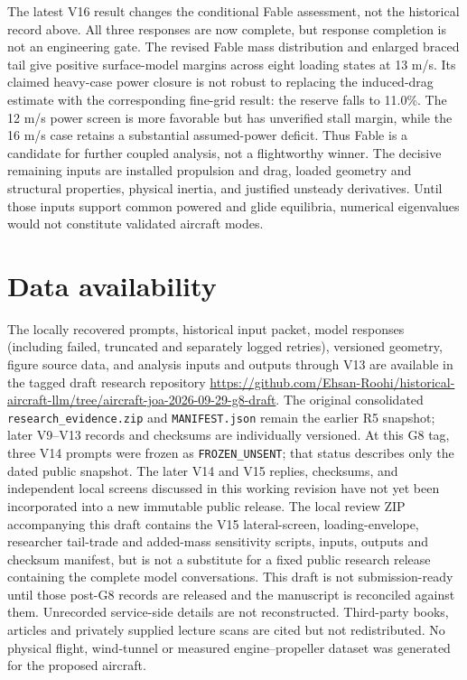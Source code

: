\documentclass[11pt,a4paper]{article}
\begin{document}
The latest V16 result changes the conditional Fable assessment, not the historical
record above. All three responses are now complete, but response completion is not
an engineering gate. The revised Fable mass distribution and enlarged braced tail
give positive surface-model margins across eight loading states at 13 m/s. Its
claimed heavy-case power closure is not robust to replacing the induced-drag
estimate with the corresponding fine-grid result: the reserve falls to 11.0\%.
The 12 m/s power screen is more favorable but has unverified stall margin, while
the 16 m/s case retains a substantial assumed-power deficit. Thus Fable is a
candidate for further coupled analysis, not a flightworthy winner. The decisive
remaining inputs are installed propulsion and drag, loaded geometry and structural
properties, physical inertia, and justified unsteady derivatives. Until those
inputs support common powered and glide equilibria, numerical eigenvalues would
not constitute validated aircraft modes.

\section*{Data availability}
The locally recovered prompts, historical input packet, model responses (including failed, truncated and separately logged retries), versioned geometry, figure source data, and analysis inputs and outputs through V13 are available in the tagged draft research repository \url{https://github.com/Ehsan-Roohi/historical-aircraft-llm/tree/aircraft-joa-2026-09-29-g8-draft}. The original consolidated \texttt{research\_evidence.zip} and \texttt{MANIFEST.json} remain the earlier R5 snapshot; later V9--V13 records and checksums are individually versioned. At this G8 tag, three V14 prompts were frozen as \texttt{FROZEN\_UNSENT}; that status describes only the dated public snapshot. The later V14 and V15 replies, checksums, and independent local screens discussed in this working revision have not yet been incorporated into a new immutable public release. The local review ZIP accompanying this draft contains the V15 lateral-screen, loading-envelope, researcher tail-trade and added-mass sensitivity scripts, inputs, outputs and checksum manifest, but is not a substitute for a fixed public research release containing the complete model conversations. This draft is not submission-ready until those post-G8 records are released and the manuscript is reconciled against them. Unrecorded service-side details are not reconstructed. Third-party books, articles and privately supplied lecture scans are cited but not redistributed. No physical flight, wind-tunnel or measured engine--propeller dataset was generated for the proposed aircraft.
\end{document}
